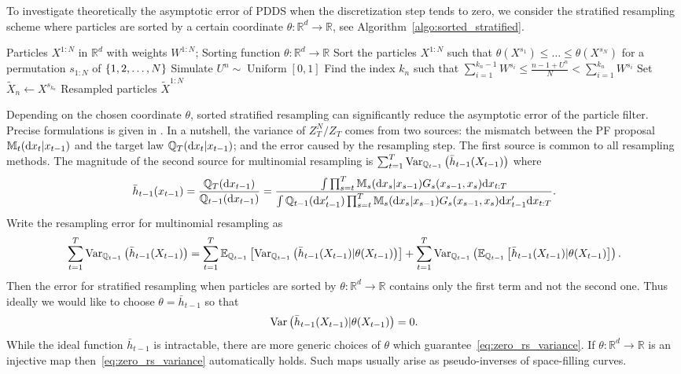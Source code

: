 \documentclass{article}
\theoremstyle{plain}
\theoremstyle{definition}
\theoremstyle{remark}
\begin{document}
To investigate theoretically the asymptotic error of PDDS when the discretization step tends to zero, we consider the stratified resampling scheme where particles are sorted by a certain coordinate $\theta:\mathbb R^d \to \mathbb R$, see Algorithm~\ref{algo:sorted_stratified}.

\begin{algorithm}
	\begin{algorithmic}
		\caption{Generic sorted stratified resampling}
		\label{algo:sorted_stratified}
		\REQUIRE Particles $X^{1:N}$ in $\mathbb R^d$ with weights $W^{1:N}$; Sorting function $\theta: \mathbb R^d \to \mathbb R$
		\STATE Sort the particles $X^{1:N}$ such that $\theta(X^{s_1}) \leq \ldots \leq \theta(X^{s_N})$ for a permutation $s_{1:N}$ of $\left\{ 1, 2, \ldots, N \right\}$
		\STATE Simulate $U^n \sim \operatorname{Uniform}[0, 1]$
		\STATE Find the index $k_n$ such that $\sum_{i=1}^{k_n-1} W^{s_i} \leq \frac{n-1+U^n}{N} < \sum_{i=1}^{k_n} W^{s_i}$
		\STATE Set $\tilde X_n \gets X^{s_{k_n}}$
		\ENDFOR
		\ENSURE Resampled particles $\tilde X^{1:N}$
	\end{algorithmic}
\end{algorithm}

\newcommand{\vqmo}{\Var_{\Q_{t-1}}}
\newcommand{\eqmo}{\E_{\Q_{t-1}}}
Depending on the chosen coordinate $\theta$, sorted stratified resampling can significantly reduce the asymptotic error of the particle filter. Precise formulations is given in \citet[Theorem 3.2]{webber2019unifying}. In a nutshell, the variance of $Z_T^N/Z_T$ comes from two sources: the mismatch between the PF proposal $\mathbb M_t(\dd x_t|x_{t-1})$ and the target law $\mathbb{Q}_T(\dd x_t|x_{t-1})$; and the error caused by the resampling step. The first source is common to all resampling methods. The magnitude of the second source for multinomial resampling is $\sum_{t=1}^T \vqmo\pr{\bar h_{t-1}(X_{t-1})}$ where
\[ \bar h_{t-1}(x_{t-1}) = \frac{\mathbb{Q}_T(\dd x_{t-1})}{\mathbb{Q}_{t-1}(\dd x_{t-1})} = \frac{\int
	\prod_{s=t}^T \mathbb M_s(\dd x_s|x_{s-1}) G_s(x_{s-1}, x_s) \dd x_{t:T}
	}{\int
	\mathbb{Q}_{t-1}(\dd x'_{t-1})\prod_{s=t}^T \mathbb M_s(\dd x_s|x_{s-1}) G_s(x_{s-1}, x_s)\dd x'_{t-1} \dd x_{t:T}
	}. \]
Write the resampling error for multinomial resampling as
\[ \sum_{t=1}^T \vqmo\pr{\bar h_{t-1}(X_{t-1})} = \sum_{t=1}^T \eqmo\ps{\vqmo\pr{ \bar h_{t-1}(X_{t-1}) | \theta(X_{t-1}) }}   + \sum_{t=1}^T \vqmo\pr{\eqmo\ps{ \bar h_{t-1}(X_{t-1}) | \theta(X_{t-1}) }}. \]
Then the error for stratified resampling when particles are sorted by $\theta: \mathbb R^d \to \mathbb R$ contains only the first term and not the second one. Thus ideally we would like to choose $\theta = \bar h_{t-1}$ so that
\begin{equation}
	\label{eq:zero_rs_variance}
	\operatorname{Var}\left( \bar h_{t-1}(X_{t-1}) | \theta(X_{t-1}) \right) = 0.
\end{equation}
While the ideal function $\bar h_{t-1}$ is intractable, there are more generic choices of $\theta$ which guarantee~\eqref{eq:zero_rs_variance}. If $\theta:\mathbb R^d \to \mathbb R$ is an injective map then~\eqref{eq:zero_rs_variance} automatically holds. Such maps usually arise as pseudo-inverses of space-filling curves.
\end{document}
